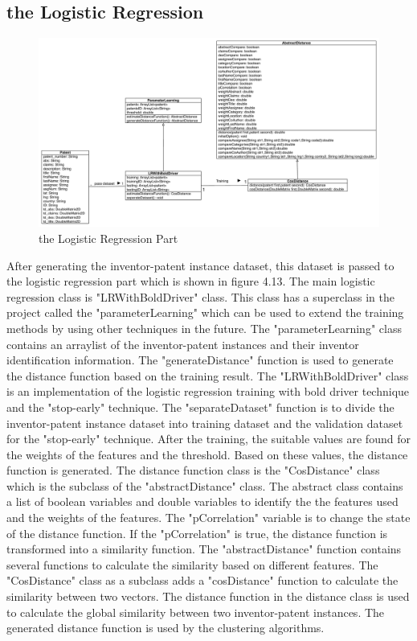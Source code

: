 \subsection{the Logistic Regression}
\begin{figure}
\centering
\includegraphics[width=\headwidth]{logisticRegression.pdf}
\caption{the Logistic Regression Part}
\end{figure}
After generating the inventor-patent instance dataset, this dataset is passed to the logistic regression part which is shown in figure 4.13. The main logistic regression class is "LRWithBoldDriver" class. This class has a superclass in the project called the "parameterLearning" which can be used to extend the training methods by using other techniques in the future. The "parameterLearning" class contains an arraylist of the inventor-patent instances and their inventor identification information. The "generateDistance" function is used to generate the distance function based on the training result. The "LRWithBoldDriver" class is an implementation of the logistic regression training with bold driver technique and the "stop-early" technique. The "separateDataset" function is to divide the inventor-patent instance dataset into training dataset and the validation dataset for the "stop-early" technique. After the training, the suitable values are found for the weights of the features and the threshold. Based on these values, the distance function is generated. The distance function class is the "CosDistance" class which is the subclass of the "abstractDistance" class. The abstract class contains a list of boolean variables and double variables to identify the the features used and the weights of the features. The "pCorrelation" variable is to change the state of the distance function. If the "pCorrelation" is true, the distance function is transformed into a similarity function. The "abstractDistance" function contains several functions to calculate the similarity based on different features. The "CosDistance" class as a subclass adds a "cosDistance" function to calculate the similarity between two vectors. The distance function in the distance class is used to calculate the global similarity between two inventor-patent instances. The generated distance function is used by the clustering algorithms.

